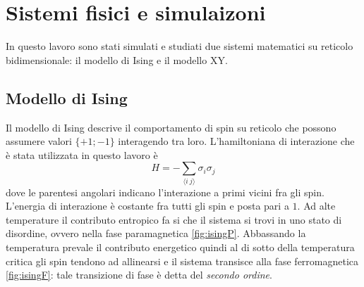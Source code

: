 \documentclass{article}
\begin{document}
\section{Sistemi fisici e simulaizoni}
In questo lavoro sono stati simulati e studiati due sistemi matematici su reticolo bidimensionale:  il modello di Ising e il modello XY.
\subsection{Modello di Ising}
Il modello di Ising descrive il comportamento di spin su reticolo che possono assumere valori $\{+1;-1\}$ interagendo tra loro. L'hamiltoniana di interazione che è stata utilizzata in questo lavoro è
\begin{equation}
H=- \sum_{\langle i~j\rangle} \sigma_i\sigma_j
\end{equation} 
dove le parentesi angolari indicano l'interazione a primi vicini fra gli spin. L'energia di interazione è costante fra tutti gli spin e posta pari a $1$. Ad alte temperature il contributo entropico fa si che il sistema si trovi in uno stato di disordine, ovvero nella fase paramagnetica \ref{fig:isingP}. Abbassando la temperatura prevale il contributo energetico quindi al di sotto della temperatura critica gli spin tendono ad allinearsi e il sistema transisce alla fase ferromagnetica \ref{fig:isingF}: tale transizione di fase è detta del \emph{secondo ordine}.
\end{document}
